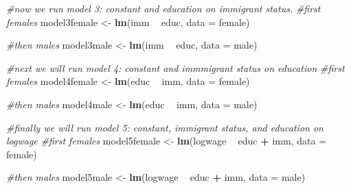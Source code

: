 \documentclass[]{article}
\newenvironment{Shaded}{\begin{snugshade}}{\end{snugshade}}
\newcommand{\CommentTok}[1]{\textcolor[rgb]{0.56,0.35,0.01}{\textit{#1}}}
\newcommand{\DataTypeTok}[1]{\textcolor[rgb]{0.13,0.29,0.53}{#1}}
\newcommand{\KeywordTok}[1]{\textcolor[rgb]{0.13,0.29,0.53}{\textbf{#1}}}
\newcommand{\NormalTok}[1]{#1}
\newcommand{\OperatorTok}[1]{\textcolor[rgb]{0.81,0.36,0.00}{\textbf{#1}}}
\newcommand{\StringTok}[1]{\textcolor[rgb]{0.31,0.60,0.02}{#1}}
\begin{document}
\begin{Shaded}
\begin{Highlighting}[]
\CommentTok{#now we run model 3: constant and education on immigrant status.}
\CommentTok{#first females}
\NormalTok{model3female <-}\StringTok{ }\KeywordTok{lm}\NormalTok{(imm }\OperatorTok{~}\StringTok{ }\NormalTok{educ, }\DataTypeTok{data =}\NormalTok{ female)}
\end{Highlighting}
\end{Shaded}

\begin{Shaded}
\begin{Highlighting}[]
\CommentTok{#then males}
\NormalTok{model3male <-}\StringTok{ }\KeywordTok{lm}\NormalTok{(imm }\OperatorTok{~}\StringTok{ }\NormalTok{educ, }\DataTypeTok{data =}\NormalTok{ male)}
\end{Highlighting}
\end{Shaded}

\begin{Shaded}
\begin{Highlighting}[]
\CommentTok{#next we will run model 4: constant and immmigrant status on education}
\CommentTok{#first females}
\NormalTok{model4female <-}\StringTok{ }\KeywordTok{lm}\NormalTok{(educ }\OperatorTok{~}\StringTok{ }\NormalTok{imm, }\DataTypeTok{data =}\NormalTok{ female)}
\end{Highlighting}
\end{Shaded}

\begin{Shaded}
\begin{Highlighting}[]
\CommentTok{#then males}
\NormalTok{model4male <-}\StringTok{ }\KeywordTok{lm}\NormalTok{(educ }\OperatorTok{~}\StringTok{ }\NormalTok{imm, }\DataTypeTok{data =}\NormalTok{ male)}
\end{Highlighting}
\end{Shaded}

\begin{Shaded}
\begin{Highlighting}[]
\CommentTok{#finally we will run model 5: constant, immigrant status, and education on logwage}
\CommentTok{#first females}
\NormalTok{model5female <-}\StringTok{ }\KeywordTok{lm}\NormalTok{(logwage }\OperatorTok{~}\StringTok{ }\NormalTok{educ }\OperatorTok{+}\StringTok{ }\NormalTok{imm, }\DataTypeTok{data =}\NormalTok{ female)}
\end{Highlighting}
\end{Shaded}

\begin{Shaded}
\begin{Highlighting}[]
\CommentTok{#then males}
\NormalTok{model5male <-}\StringTok{ }\KeywordTok{lm}\NormalTok{(logwage }\OperatorTok{~}\StringTok{ }\NormalTok{educ }\OperatorTok{+}\StringTok{ }\NormalTok{imm, }\DataTypeTok{data =}\NormalTok{ male)}
\end{Highlighting}
\end{Shaded}
\end{document}

